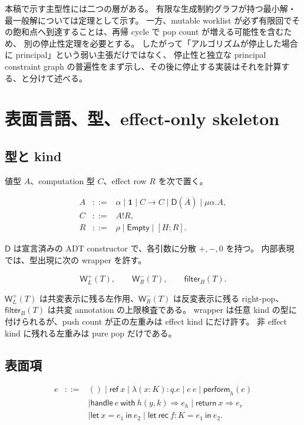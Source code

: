 \documentclass[uplatex,dvipdfmx,a4paper,10.5pt]{jsarticle}
\theoremstyle{jpplain}
\newcommand{\Empty}{\mathsf{Empty}}
\newcommand{\Unit}{\mathbf 1}
\newcommand{\Filter}[2]{\mathsf{filter}_{#1}(#2)}
\newcommand{\PWeight}[2]{\mathsf{W}^{+}_{#1}(#2)}
\newcommand{\NWeight}[2]{\mathsf{W}^{-}_{#1}(#2)}
\newcommand{\row}[2]{[#1;#2]}
\newcommand{\comp}{\mathbin{!}}
\newcommand{\kw}[1]{\mathsf{#1}}
\begin{document}
\begin{statusbox}
本稿で示す主型性には二つの層がある。
有限な生成制約グラフが持つ最小解・最一般解については定理として示す。
一方、mutable worklist が必ず有限回でその飽和点へ到達することは、再帰 cycle で pop count が増える可能性を含むため、
別の停止性定理を必要とする。
したがって「アルゴリズムが停止した場合に principal」という弱い主張だけではなく、
停止性と独立な principal constraint graph の普遍性をまず示し、その後に停止する実装はそれを計算する、と分けて述べる。
\end{statusbox}

\section{表面言語、型、effect-only skeleton}

\subsection{型と kind}

値型 $A$、computation 型 $C$、effect row $R$ を次で置く。

\[
\begin{array}{rcl}
A &::=& \alpha \mid \Unit \mid C\to C \mid \kw{D}(\overline{A}) \mid \mu\alpha.A,\\
C &::=& A\comp R,\\
R &::=& \rho \mid \Empty \mid \row{H}{R}.
\end{array}
\]

$\kw{D}$ は宣言済みの ADT constructor で、各引数に分散 $+, -, 0$ を持つ。
内部表現では、型出現に次の wrapper を許す。

\[
  \PWeight{L}{T},\qquad
  \NWeight{R}{T},\qquad
  \Filter{B}{T}.
\]

$\PWeight{L}{T}$ は共変表示に残る左作用、$\NWeight{R}{T}$ は反変表示に残る right-pop、
$\Filter{B}{T}$ は共変 annotation の上限検査である。
wrapper は任意 kind の型に付けられるが、push count が正の左重みは effect kind にだけ許す。
非 effect kind に残れる左重みは pure pop だけである。

\subsection{表面項}

\[
\begin{array}{rcl}
e &::=& () \mid \kw{ref}\ x
 \mid \lambda(x:K):q.e
 \mid e\ e
 \mid \kw{perform}_{h}(e)\\
&& \mid \kw{handle}\ e\ \kw{with}\ h(y,k)\Rightarrow e_h
       \mid \kw{return}\ x\Rightarrow e_r\\
&& \mid \kw{let}\ x=e_1\ \kw{in}\ e_2
 \mid \kw{let\ rec}\ f:K=e_1\ \kw{in}\ e_2.
\end{array}
\]
\end{document}
